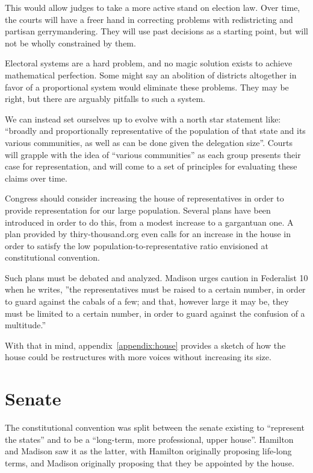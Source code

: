 \documentclass{article}
\begin{document}
This would allow judges to take a more active stand on election law. Over time, the courts will have a freer hand in correcting problems with redistricting and partisan gerrymandering. They will use past decisions as a starting point, but will not be wholly constrained by them.

Electoral systems are a hard problem, and no magic solution exists to achieve mathematical perfection. Some might say an abolition of districts altogether in favor of a proportional system would eliminate these problems. They may be right, but there are arguably pitfalls to such a system.

We can instead set ourselves up to evolve with a north star statement like: “broadly and proportionally representative of the population of that state and its various communities, as well as can be done given the delegation size”. Courts will grapple with the idea of “various communities” as each group presents their case for representation, and will come to a set of principles for evaluating these claims over time.

Congress should consider increasing the house of representatives in order to provide representation for our large population. Several plans have been introduced in order to do this, from a modest increase to a gargantuan one\cite{Allen}. A plan provided by thiry-thousand.org even calls for an increase in the house in order to satisfy the low population-to-representative ratio envisioned at constitutional convention\cite{30000}.

Such plans must be debated and analyzed. Madison urges caution in Federalist 10 when he writes, ”the representatives must be raised to a certain number, in order to guard against the cabals of a few; and that, however large it may be, they must be limited to a certain number, in order to guard against the confusion of a multitude.”\cite{Federalist10}

With that in mind, appendix~\ref{appendix:house} provides a sketch of how the house could be restructures with more voices without increasing its size.

\section{Senate}
\label{section:Senate}

The constitutional convention was split between the senate existing to “represent the states” and to be a “long-term, more professional, upper house”. Hamilton and Madison saw it as the latter, with Hamilton originally proposing life-long terms, and Madison originally proposing that they be appointed by the house.
\end{document}
